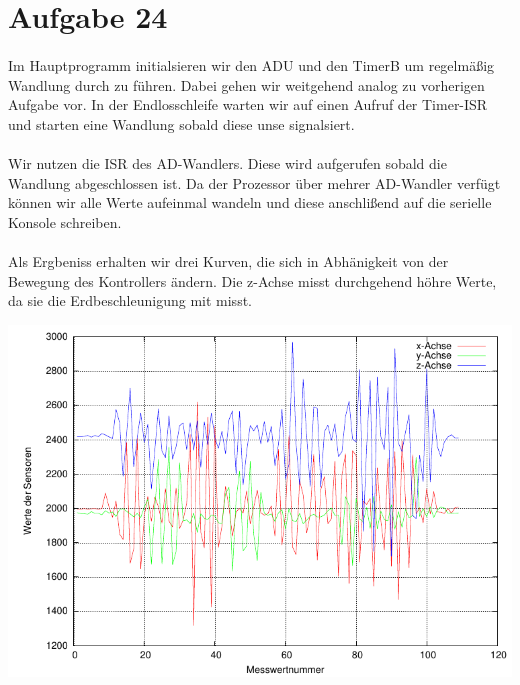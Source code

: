 

\section{Aufgabe 24}

\paragraph*{}
Im Hauptprogramm initialsieren wir den ADU und den TimerB um regelmäßig Wandlung durch zu führen. Dabei gehen wir weitgehend analog zu vorherigen Aufgabe vor. In der Endlosschleife warten wir auf einen Aufruf der Timer-ISR und starten eine Wandlung sobald diese unse signalsiert. 


\paragraph*{}
Wir nutzen die ISR des AD-Wandlers. Diese wird aufgerufen sobald die Wandlung abgeschlossen ist. Da der Prozessor über mehrer AD-Wandler verfügt können wir alle Werte aufeinmal wandeln und diese anschlißend auf die serielle Konsole schreiben.  



\paragraph*{}
Als Ergbeniss erhalten wir drei Kurven, die sich in Abhänigkeit von der Bewegung des Kontrollers ändern. Die z-Achse misst durchgehend höhre Werte, da sie die Erdbeschleunigung mit misst.

\includegraphics[width=\textwidth]{graphs/accel.pdf}

